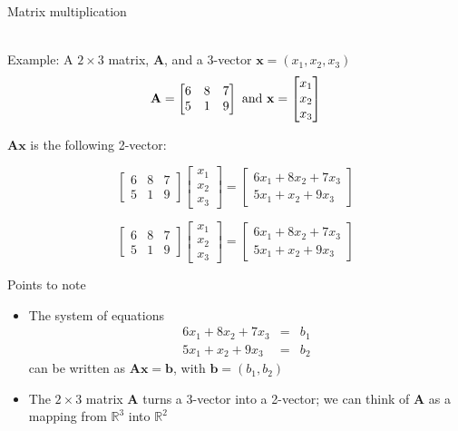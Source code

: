 \documentclass[10pt]{seminar}
\begin{document}
\begin{slide}
\newslide
Matrix multiplication

\ \\Example: A $2\times 3$ matrix, $\mathbf{A}$, and a 3-vector $\mathbf{x}=(x_1, x_2, x_3)$
$$\mathbf{A}=
\begin{bmatrix}
 6 & 8& 7\\
 5& 1& 9
\end{bmatrix} \hbox{ and }
 \mathbf{x}=\begin{bmatrix}
 x_1\\
 x_2\\
 x_3
\end{bmatrix}
$$

$\mathbf{Ax}$ is the following 2-vector:

$$
\begin{bmatrix}
 6 & 8& 7\\
 5& 1& 9
\end{bmatrix}
\begin{bmatrix}
 x_1\\
 x_2\\
 x_3
\end{bmatrix}
=
\begin{bmatrix}
6x_1+8x_2+7x_3\\
5x_1+x_2+9x_3
\end{bmatrix}
$$

\newslide

$$
\begin{bmatrix}
 6 & 8& 7\\
 5& 1& 9
\end{bmatrix}
\begin{bmatrix}
 x_1\\
 x_2\\
 x_3
\end{bmatrix}
=
\begin{bmatrix}
6x_1+8x_2+7x_3\\
5x_1+x_2+9x_3
\end{bmatrix}
$$

Points to note
\begin{itemize}
\item The system of equations 
$$\begin{array}{rcl}
6x_1+8x_2+7x_3&=&b_1\\
5x_1+x_2+9x_3&=&b_2
\end{array}
$$ can be written as $\mathbf{Ax}=\mathbf{b}$, with $\mathbf{b}=(b_1, b_2)$
\item The $2\times 3$ matrix $\mathbf{A}$ turns a 3-vector into a 2-vector; we can think of $\mathbf{A}$ as a mapping from $\mathbb{R}^3$ into $\mathbb{R}^2$
\end{itemize}


\end{slide}
\end{document}
